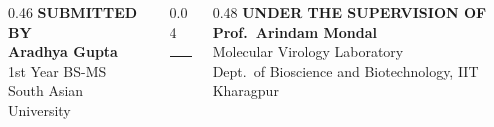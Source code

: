 \documentclass[aspectratio=169, 10pt]{beamer}
\begin{document}
{\begin{frame}[plain]
  \vspace{0.45cm}
  \begin{columns}[T]
    \begin{column}{0.46\textwidth}
      \centering
      {\footnotesize\color{textmuted}\textbf{SUBMITTED BY}}\\[0.25em]
      {\large\bfseries\color{navyprimary} Aradhya Gupta}\\[0.15em]
      {\small\color{textdark} 1st Year BS-MS}\\
      {\small\color{steelsecondary} South Asian University}
    \end{column}
    \begin{column}{0.04\textwidth}
      \centering
      \color{slateborder}\rule{0.8pt}{1.8cm}
    \end{column}
    \begin{column}{0.48\textwidth}
      \centering
      {\footnotesize\color{textmuted}\textbf{UNDER THE SUPERVISION OF}}\\[0.25em]
      {\large\bfseries\color{navyprimary} Prof.\ Arindam Mondal}\\[0.15em]
      {\small\color{textdark} Molecular Virology Laboratory}\\
      {\small\color{steelsecondary} Dept.\ of Bioscience and Biotechnology, IIT Kharagpur}
    \end{column}
  \end{columns}
\end{frame}
}
\end{document}
